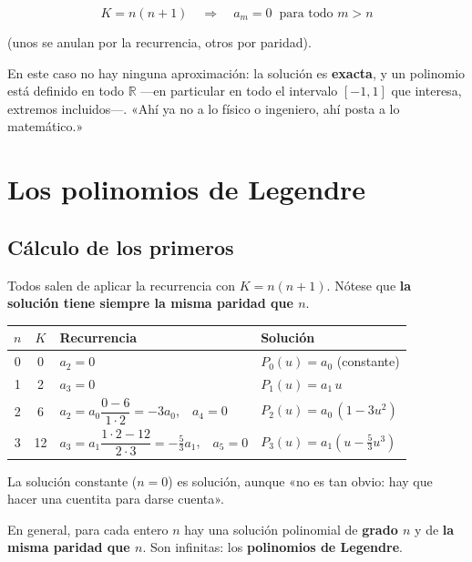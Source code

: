 \documentclass[12pt,a4paper]{article}
\begin{document}
\[
\boxed{\;K = n(n+1)\quad\Longrightarrow\quad a_m = 0 \;\;\text{para todo } m > n\;}
\]

(unos se anulan por la recurrencia, otros por paridad).

\begin{keybox}
En este caso no hay ninguna aproximación: la solución es \textbf{exacta}, y un
polinomio está definido en todo $\mathbb{R}$ ---en particular en todo el intervalo
$[-1,1]$ que interesa, extremos incluidos---. «Ahí ya no a lo físico o ingeniero,
ahí posta a lo matemático.»
\end{keybox}

\section{Los polinomios de Legendre}

\subsection{Cálculo de los primeros}

Todos salen de aplicar la recurrencia con $K = n(n+1)$. Nótese que \textbf{la
solución tiene siempre la misma paridad que $n$}.

\begin{table}[H]
  \centering
  \begin{tabularx}{\textwidth}{@{}c c X l@{}}
    \toprule
    $n$ & $K$ & \textbf{Recurrencia} & \textbf{Solución} \\
    \midrule
    0 & 0  & $a_2 = 0$ & $P_0(u) = a_0$ (constante) \\[0.3em]
    1 & 2  & $a_3 = 0$ & $P_1(u) = a_1\,u$ \\[0.3em]
    2 & 6  & $a_2 = a_0\dfrac{0-6}{1\cdot2} = -3a_0$,\ \ $a_4=0$
        & $P_2(u) = a_0\,(1 - 3u^2)$ \\[0.7em]
    3 & 12 & $a_3 = a_1\dfrac{1\cdot2-12}{2\cdot3} = -\tfrac{5}{3}a_1$,\ \ $a_5=0$
        & $P_3(u) = a_1\left(u - \tfrac{5}{3}u^3\right)$ \\
    \bottomrule
  \end{tabularx}
\end{table}

\begin{notebox}[La constante]
La solución constante ($n=0$) es solución, aunque «no es tan obvio: hay que hacer
una cuentita para darse cuenta».
\end{notebox}

En general, para cada entero $n$ hay una solución polinomial de \textbf{grado
$n$} y de \textbf{la misma paridad que $n$}. Son infinitas: los \textbf{polinomios
de Legendre}.
\end{document}
